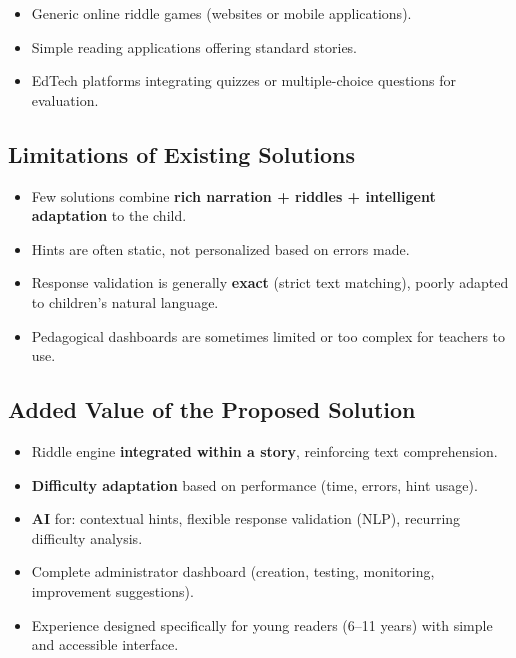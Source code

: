 \documentclass[12pt,a4paper]{article}
\begin{document}
\begin{itemize}
    \item Generic online riddle games (websites or mobile applications).
    \item Simple reading applications offering standard stories.
    \item EdTech platforms integrating quizzes or multiple-choice questions for evaluation.
\end{itemize}

\subsection{Limitations of Existing Solutions}

\begin{itemize}
    \item Few solutions combine \textbf{rich narration + riddles + intelligent adaptation} to the child.
    \item Hints are often static, not personalized based on errors made.
    \item Response validation is generally \textbf{exact} (strict text matching), poorly adapted to children's natural language.
    \item Pedagogical dashboards are sometimes limited or too complex for teachers to use.
\end{itemize}

\subsection{Added Value of the Proposed Solution}

\begin{itemize}
    \item Riddle engine \textbf{integrated within a story}, reinforcing text comprehension.
    \item \textbf{Difficulty adaptation} based on performance (time, errors, hint usage).
    \item \textbf{AI} for: contextual hints, flexible response validation (NLP), recurring difficulty analysis.
    \item Complete administrator dashboard (creation, testing, monitoring, improvement suggestions).
    \item Experience designed specifically for young readers (6--11 years) with simple and accessible interface.
\end{itemize}

\newpage
\end{document}
